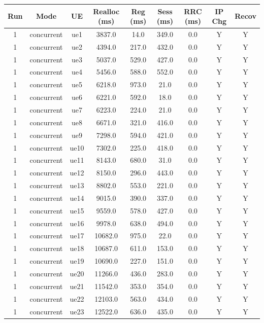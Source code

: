 \begin{table}[ht]
\centering
\begin{tabular}{|c|c|c|c|c|c|c|c|c|}
\hline
Run & Mode & UE & Realloc (ms) & Reg (ms) & Sess (ms) & RRC (ms) & IP Chg & Recov \\
\hline
1 & concurrent & ue1 & 3837.0 & 14.0 & 349.0 & 0.0 & Y & Y \\
1 & concurrent & ue2 & 4394.0 & 217.0 & 432.0 & 0.0 & Y & Y \\
1 & concurrent & ue3 & 5037.0 & 529.0 & 427.0 & 0.0 & Y & Y \\
1 & concurrent & ue4 & 5456.0 & 588.0 & 552.0 & 0.0 & Y & Y \\
1 & concurrent & ue5 & 6218.0 & 973.0 & 21.0 & 0.0 & Y & Y \\
1 & concurrent & ue6 & 6221.0 & 592.0 & 18.0 & 0.0 & Y & Y \\
1 & concurrent & ue7 & 6223.0 & 224.0 & 21.0 & 0.0 & Y & Y \\
1 & concurrent & ue8 & 6671.0 & 321.0 & 416.0 & 0.0 & Y & Y \\
1 & concurrent & ue9 & 7298.0 & 594.0 & 421.0 & 0.0 & Y & Y \\
1 & concurrent & ue10 & 7302.0 & 225.0 & 418.0 & 0.0 & Y & Y \\
1 & concurrent & ue11 & 8143.0 & 680.0 & 31.0 & 0.0 & Y & Y \\
1 & concurrent & ue12 & 8150.0 & 296.0 & 443.0 & 0.0 & Y & Y \\
1 & concurrent & ue13 & 8802.0 & 553.0 & 221.0 & 0.0 & Y & Y \\
1 & concurrent & ue14 & 9015.0 & 390.0 & 337.0 & 0.0 & Y & Y \\
1 & concurrent & ue15 & 9559.0 & 578.0 & 427.0 & 0.0 & Y & Y \\
1 & concurrent & ue16 & 9978.0 & 638.0 & 494.0 & 0.0 & Y & Y \\
1 & concurrent & ue17 & 10682.0 & 975.0 & 22.0 & 0.0 & Y & Y \\
1 & concurrent & ue18 & 10687.0 & 611.0 & 153.0 & 0.0 & Y & Y \\
1 & concurrent & ue19 & 10690.0 & 227.0 & 151.0 & 0.0 & Y & Y \\
1 & concurrent & ue20 & 11266.0 & 436.0 & 283.0 & 0.0 & Y & Y \\
1 & concurrent & ue21 & 11542.0 & 353.0 & 354.0 & 0.0 & Y & Y \\
1 & concurrent & ue22 & 12103.0 & 563.0 & 434.0 & 0.0 & Y & Y \\
1 & concurrent & ue23 & 12522.0 & 636.0 & 435.0 & 0.0 & Y & Y \\

\end{tabular}
\end{table}
